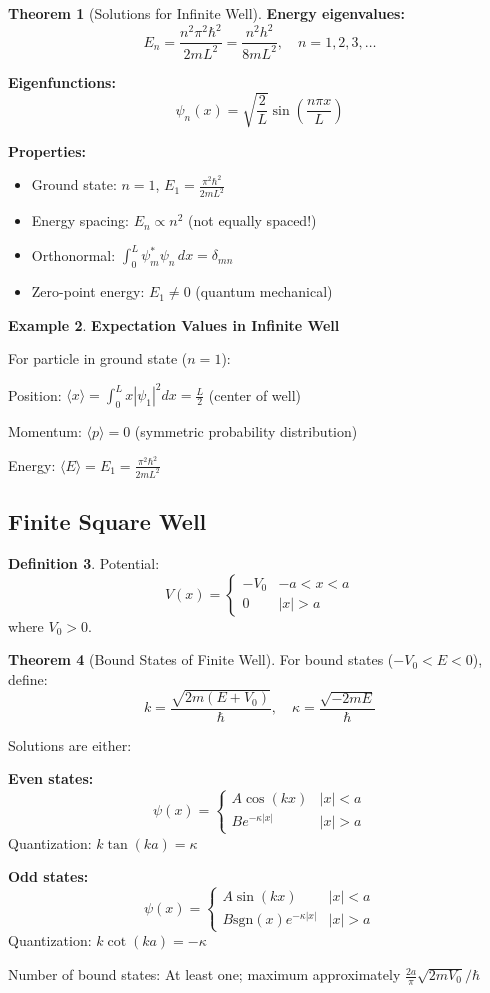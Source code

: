 \documentclass[12pt,a4paper]{article}
\theoremstyle{definition}
\newtheorem{theorem}{Theorem}[section]
\newtheorem{definition}[theorem]{Definition}
\newtheorem{example}[theorem]{Example}
\begin{document}
\begin{theorem}[Solutions for Infinite Well]
\textbf{Energy eigenvalues:}
\[
E_n = \frac{n^2\pi^2\hbar^2}{2mL^2} = \frac{n^2h^2}{8mL^2}, \quad n = 1, 2, 3, \ldots
\]

\textbf{Eigenfunctions:}
\[
\psi_n(x) = \sqrt{\frac{2}{L}}\sin\left(\frac{n\pi x}{L}\right)
\]

\textbf{Properties:}
\begin{itemize}
    \item Ground state: $n = 1$, $E_1 = \frac{\pi^2\hbar^2}{2mL^2}$
    \item Energy spacing: $E_n \propto n^2$ (not equally spaced!)
    \item Orthonormal: $\int_0^L \psi_m^*\psi_n\,dx = \delta_{mn}$
    \item Zero-point energy: $E_1 \neq 0$ (quantum mechanical)
\end{itemize}
\end{theorem}


\begin{example}
\textbf{Expectation Values in Infinite Well}

For particle in ground state ($n=1$):

Position: $\langle x\rangle = \int_0^L x|\psi_1|^2 dx = \frac{L}{2}$ (center of well)

Momentum: $\langle p\rangle = 0$ (symmetric probability distribution)

Energy: $\langle E\rangle = E_1 = \frac{\pi^2\hbar^2}{2mL^2}$
\end{example}

\subsection{Finite Square Well}

\begin{definition}
Potential:
\[
V(x) = \begin{cases}
-V_0 & -a < x < a \\
0 & |x| > a
\end{cases}
\]
where $V_0 > 0$.
\end{definition}

\begin{theorem}[Bound States of Finite Well]
For bound states ($-V_0 < E < 0$), define:
\[
k = \frac{\sqrt{2m(E + V_0)}}{\hbar}, \quad \kappa = \frac{\sqrt{-2mE}}{\hbar}
\]

Solutions are either:

\textbf{Even states:}
\[
\psi(x) = \begin{cases}
A\cos(kx) & |x| < a \\
Be^{-\kappa|x|} & |x| > a
\end{cases}
\]
Quantization: $k\tan(ka) = \kappa$

\textbf{Odd states:}
\[
\psi(x) = \begin{cases}
A\sin(kx) & |x| < a \\
B\text{sgn}(x)e^{-\kappa|x|} & |x| > a
\end{cases}
\]
Quantization: $k\cot(ka) = -\kappa$

Number of bound states: At least one; maximum approximately $\frac{2a}{\pi}\sqrt{2mV_0}/\hbar$
\end{theorem}
\end{document}

